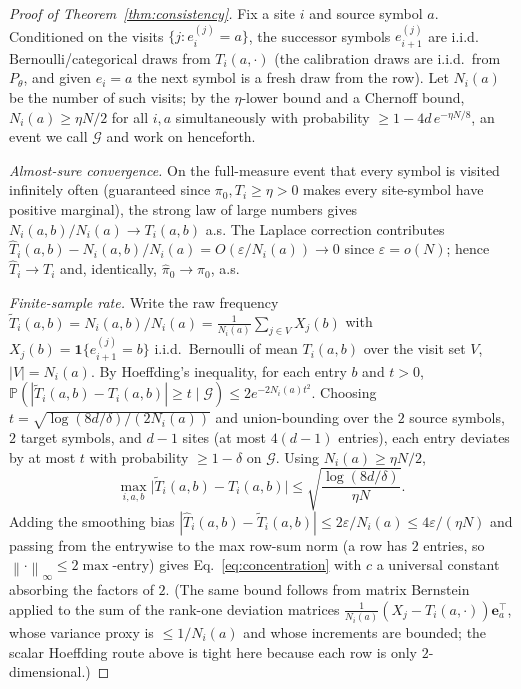 \documentclass[reprint,aps,prxquantum,amsmath,amssymb,floatfix,nofootinbib,longbibliography]{revtex4-2}
\theoremstyle{definition}
\theoremstyle{remark}
\theoremstyle{plain}
\newcommand{\PP}{\mathbb{P}}
\newcommand{\eps}{\varepsilon}
\newcommand{\norm}[1]{\left\lVert #1 \right\rVert}
\newcommand{\abs}[1]{\left\lvert #1 \right\rvert}
\begin{document}
\begin{proof}[Proof of Theorem~\ref{thm:consistency}]
Fix a site $i$ and source symbol $a$. Conditioned on the visits
$\{j:e^{(j)}_i=a\}$, the successor symbols $e^{(j)}_{i+1}$ are i.i.d.\
$\mathrm{Bernoulli}$/categorical draws from $T_i(a,\cdot)$ (the calibration
draws are i.i.d.\ from $P_\theta$, and given $e_i=a$ the next symbol is a fresh
draw from the row). Let $N_i(a)$ be the number of such visits; by the
$\eta$-lower bound and a Chernoff bound, $N_i(a)\ge\eta N/2$ for all $i,a$
simultaneously with probability $\ge1-4d\,e^{-\eta N/8}$, an event we call
$\mathcal G$ and work on henceforth.

\emph{Almost-sure convergence.} On the full-measure event that every symbol is
visited infinitely often (guaranteed since $\pi_0,T_i\ge\eta>0$ makes every
site-symbol have positive marginal), the strong law of large numbers gives
$N_i(a,b)/N_i(a)\to T_i(a,b)$ a.s. The Laplace correction contributes
$\hat T_i(a,b)-N_i(a,b)/N_i(a)=O(\eps/N_i(a))\to0$ since $\eps=o(N)$; hence
$\hat T_i\to T_i$ and, identically, $\hat\pi_0\to\pi_0$, a.s.

\emph{Finite-sample rate.} Write the raw frequency
$\tilde T_i(a,b)=N_i(a,b)/N_i(a)=\tfrac1{N_i(a)}\sum_{j\in V}X_j(b)$ with
$X_j(b)=\mathbf 1\{e^{(j)}_{i+1}=b\}$ i.i.d.\ Bernoulli of mean $T_i(a,b)$ over
the visit set $V$, $\abs V=N_i(a)$. By Hoeffding's inequality, for each entry
$b$ and $t>0$,
$\PP(\abs{\tilde T_i(a,b)-T_i(a,b)}\ge t\mid \mathcal G)\le2e^{-2N_i(a)t^2}$.
Choosing $t=\sqrt{\log(8d/\delta)/(2N_i(a))}$ and union-bounding over the $2$
source symbols, $2$ target symbols, and $d-1$ sites (at most $4(d-1)$ entries),
each entry deviates by at most $t$ with probability $\ge1-\delta$ on
$\mathcal G$. Using $N_i(a)\ge\eta N/2$,
\begin{equation}
  \max_{i,a,b}\bigl|\tilde T_i(a,b)-T_i(a,b)\bigr|
   \le\sqrt{\frac{\log(8d/\delta)}{\eta N}} .
\end{equation}
Adding the smoothing bias $\abs{\hat T_i(a,b)-\tilde T_i(a,b)}\le
2\eps/N_i(a)\le4\eps/(\eta N)$ and passing from the entrywise to the max
row-sum norm (a row has $2$ entries, so $\norm{\cdot}_\infty\le2\max$-entry)
gives Eq.~\eqref{eq:concentration} with $c$ a universal constant absorbing the
factors of $2$. (The same bound follows from matrix Bernstein applied to the
sum of the rank-one deviation matrices $\tfrac1{N_i(a)}(X_j-T_i(a,\cdot))
\mathbf e_a^{\!\top}$, whose variance proxy is $\le1/N_i(a)$ and whose
increments are bounded; the scalar Hoeffding route above is tight here because
each row is only $2$-dimensional.)


\end{proof}
\end{document}
